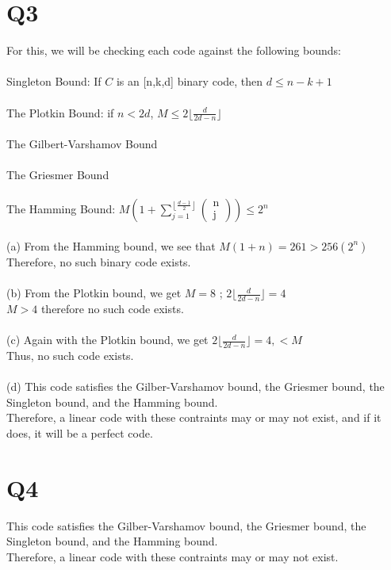 \documentclass{article}
\begin{document}
	\section{Q3}
For this, we will be checking each code against the following bounds:\\\\
Singleton Bound: If $C$ is an [n,k,d] binary code, then $d \leq n-k+1$\\\\
The Plotkin Bound: if $n < 2d$, $M \leq 2 \lfloor \frac{d}{2d-n} \rfloor$ \\\\
The Gilbert-Varshamov Bound\\\\
The Griesmer Bound\\\\
The Hamming Bound: $M \left(1+\sum_{j=1}^{\left\lfloor\frac{d-1}{2}\right\rfloor} \left( \begin{array}{c}{\mathrm{n}} \\ {\mathrm{j}}\end{array}\right)\right) \leq 2^{n}$\\\\
(a) From the Hamming bound, we see that $M(1+n) = 261 > 256 (2^n)$\\
Therefore, no such binary code exists.\\\\
(b) From the Plotkin bound, we get $M = 8$ ; $2 \lfloor \frac{d}{2d-n} \rfloor = 4$\\
$M > 4$ therefore no such code exists.\\\\
(c) Again with the Plotkin bound, we get $2 \lfloor \frac{d}{2d-n} \rfloor = 4, < M$\\
Thus, no such code exists.\\\\
(d) This code satisfies the Gilber-Varshamov bound, the Griesmer bound, the Singleton bound, and the Hamming bound.\\
Therefore, a linear code with these contraints may or may not exist, and if it does, it will be a perfect code.
\section{Q4}
This code satisfies the Gilber-Varshamov bound, the Griesmer bound, the Singleton bound, and the Hamming bound.\\
Therefore, a linear code with these contraints may or may not exist.
\end{document}
